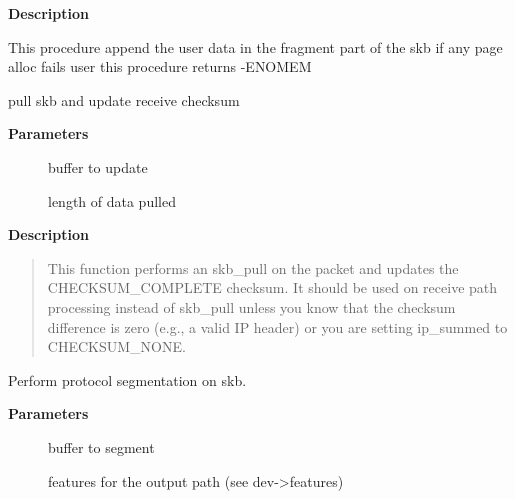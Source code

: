 \documentclass[a4paper,8pt,english]{sphinxmanual}
\begin{document}
\textbf{Description}

This procedure append the user data in the fragment part
of the skb if any page alloc fails user this procedure returns  -ENOMEM

\begin{fulllineitems}
\label{networking/kapi:c.skb_pull_rcsum}
pull skb and update receive checksum

\end{fulllineitems}


\textbf{Parameters}
\begin{description}
\item[{}] \leavevmode
buffer to update

\item[{}] \leavevmode
length of data pulled

\end{description}

\textbf{Description}
\begin{quote}

This function performs an skb\_pull on the packet and updates
the CHECKSUM\_COMPLETE checksum.  It should be used on
receive path processing instead of skb\_pull unless you know
that the checksum difference is zero (e.g., a valid IP header)
or you are setting ip\_summed to CHECKSUM\_NONE.
\end{quote}

\begin{fulllineitems}
\label{networking/kapi:c.skb_segment}
Perform protocol segmentation on skb.

\end{fulllineitems}


\textbf{Parameters}
\begin{description}
\item[{}] \leavevmode
buffer to segment

\item[{}] \leavevmode
features for the output path (see dev-\textgreater{}features)

\end{description}
\end{document}
